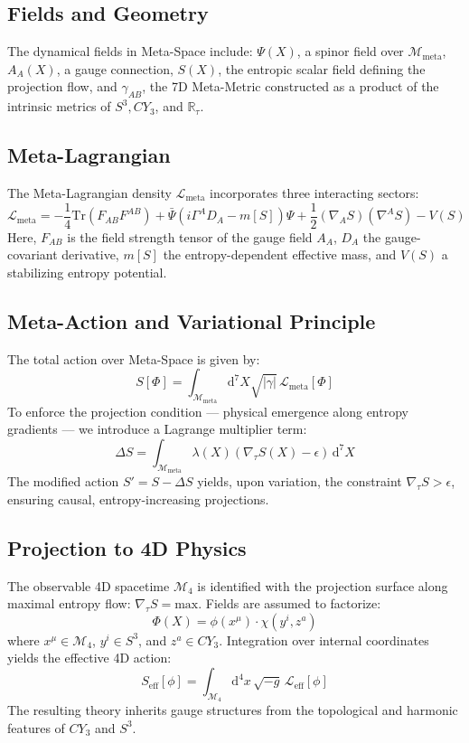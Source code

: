 \documentclass[10.5pt,a4paper]{article}
\begin{document}
\subsection{Fields and Geometry}
The dynamical fields in Meta-Space include:
\( \Psi(X) \), a spinor field over \( \mathcal{M}_{\text{meta}} \),
\( A_A(X) \), a gauge connection,
\( S(X) \), the entropic scalar field defining the projection flow,
and \( \gamma_{AB} \), the 7D Meta-Metric constructed as a product of the intrinsic metrics of \( S^3, CY_3 \), and \( \mathbb{R}_\tau \).

\subsection{Meta-Lagrangian}
The Meta-Lagrangian density \( \mathcal{L}_{\text{meta}} \) incorporates three interacting sectors:
\[
\mathcal{L}_{\text{meta}} = -\frac{1}{4} \mathrm{Tr}(F_{AB}F^{AB})
+ \bar{\Psi}(i\Gamma^A D_A - m[S])\Psi
+ \frac{1}{2}(\nabla_A S)(\nabla^A S)
- V(S)
\]
Here, \( F_{AB} \) is the field strength tensor of the gauge field \( A_A \), \( D_A \) the gauge-covariant derivative,
\( m[S] \) the entropy-dependent effective mass, and \( V(S) \) a stabilizing entropy potential.

\subsection{Meta-Action and Variational Principle}
The total action over Meta-Space is given by:
\[
S[\Phi] = \int_{\mathcal{M}_{\text{meta}}} \mathrm{d}^7X \sqrt{|\gamma|} \, \mathcal{L}_{\text{meta}}[\Phi]
\]
To enforce the projection condition — physical emergence along entropy gradients — we introduce a Lagrange multiplier term:
\[
\Delta S = \int_{\mathcal{M}_{\text{meta}}} \lambda(X) (\nabla_\tau S(X) - \epsilon) \, \mathrm{d}^7X
\]
The modified action \( S' = S - \Delta S \) yields, upon variation, the constraint \( \nabla_\tau S > \epsilon \), ensuring causal, entropy-increasing projections.

\subsection{Projection to 4D Physics}
The observable 4D spacetime \( \mathcal{M}_4 \) is identified with the projection surface along maximal entropy flow:
\( \nabla_\tau S = \text{max} \).
Fields are assumed to factorize:
\[
\Phi(X) = \phi(x^\mu) \cdot \chi(y^i, z^a)
\]
where \( x^\mu \in \mathcal{M}_4 \), \( y^i \in S^3 \), and \( z^a \in CY_3 \).
Integration over internal coordinates yields the effective 4D action:
\[
S_{\text{eff}}[\phi] = \int_{\mathcal{M}_4} \mathrm{d}^4x \, \sqrt{-g} \, \mathcal{L}_{\text{eff}}[\phi]
\]
The resulting theory inherits gauge structures from the topological and harmonic features of \( CY_3 \) and \( S^3 \).
\end{document}
